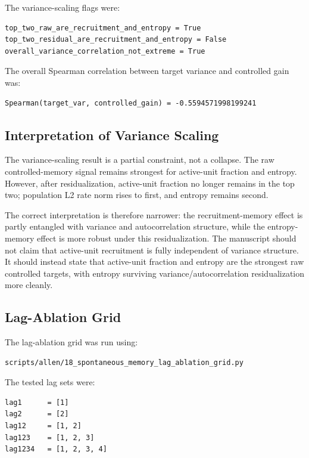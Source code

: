 The variance-scaling flags were:

\begin{verbatim}
top_two_raw_are_recruitment_and_entropy = True
top_two_residual_are_recruitment_and_entropy = False
overall_variance_correlation_not_extreme = True
\end{verbatim}

The overall Spearman correlation between target variance and controlled gain was:

\begin{verbatim}
Spearman(target_var, controlled_gain) = -0.5594571998199241
\end{verbatim}

\subsection{Interpretation of Variance Scaling}

The variance-scaling result is a partial constraint, not a collapse. The raw controlled-memory signal remains strongest for active-unit fraction and entropy. However, after residualization, active-unit fraction no longer remains in the top two; population L2 rate norm rises to first, and entropy remains second.

The correct interpretation is therefore narrower: the recruitment-memory effect is partly entangled with variance and autocorrelation structure, while the entropy-memory effect is more robust under this residualization. The manuscript should not claim that active-unit recruitment is fully independent of variance structure. It should instead state that active-unit fraction and entropy are the strongest raw controlled targets, with entropy surviving variance/autocorrelation residualization more cleanly.

\subsection{Lag-Ablation Grid}

The lag-ablation grid was run using:

\begin{verbatim}
scripts/allen/18_spontaneous_memory_lag_ablation_grid.py
\end{verbatim}

The tested lag sets were:

\begin{verbatim}
lag1      = [1]
lag2      = [2]
lag12     = [1, 2]
lag123    = [1, 2, 3]
lag1234   = [1, 2, 3, 4]
\end{verbatim}

